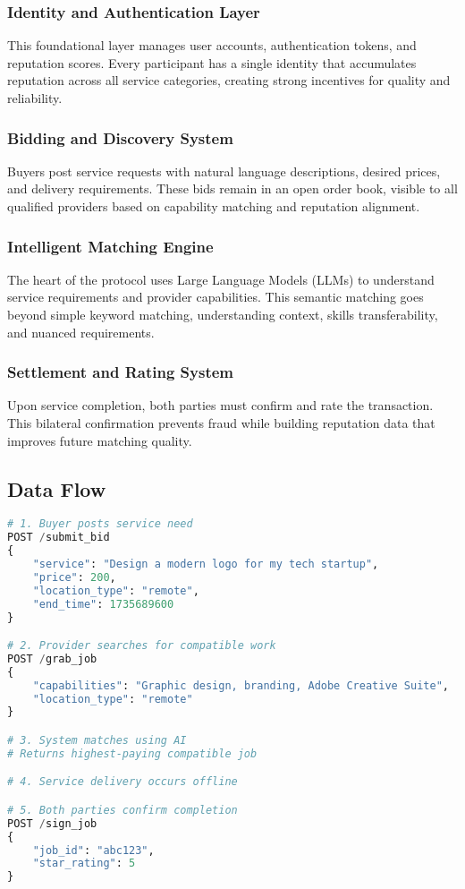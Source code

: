 \documentclass[11pt,a4paper]{article}
\begin{document}
\subsubsection{Identity and Authentication Layer}

This foundational layer manages user accounts, authentication tokens, and reputation scores. Every participant has a single identity that accumulates reputation across all service categories, creating strong incentives for quality and reliability.

\subsubsection{Bidding and Discovery System}

Buyers post service requests with natural language descriptions, desired prices, and delivery requirements. These bids remain in an open order book, visible to all qualified providers based on capability matching and reputation alignment.

\subsubsection{Intelligent Matching Engine}

The heart of the protocol uses Large Language Models (LLMs) to understand service requirements and provider capabilities. This semantic matching goes beyond simple keyword matching, understanding context, skills transferability, and nuanced requirements.

\subsubsection{Settlement and Rating System}

Upon service completion, both parties must confirm and rate the transaction. This bilateral confirmation prevents fraud while building reputation data that improves future matching quality.

\subsection{Data Flow}

\begin{lstlisting}[language=Python, caption=Typical Transaction Flow]
# 1. Buyer posts service need
POST /submit_bid
{
    "service": "Design a modern logo for my tech startup",
    "price": 200,
    "location_type": "remote",
    "end_time": 1735689600
}

# 2. Provider searches for compatible work
POST /grab_job
{
    "capabilities": "Graphic design, branding, Adobe Creative Suite",
    "location_type": "remote"
}

# 3. System matches using AI
# Returns highest-paying compatible job

# 4. Service delivery occurs offline

# 5. Both parties confirm completion
POST /sign_job
{
    "job_id": "abc123",
    "star_rating": 5
}
\end{lstlisting}
\end{document}
